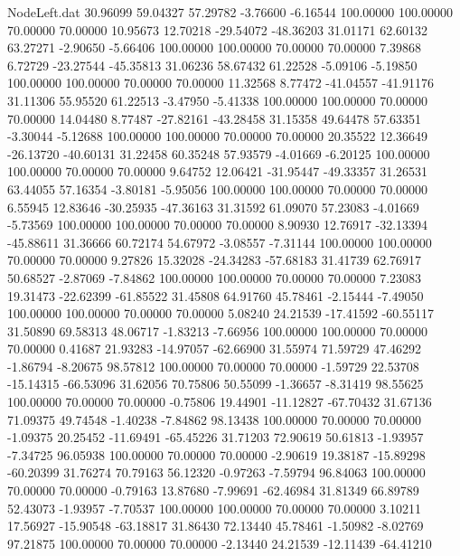 \begin{filecontents}{NodeLeft.dat}
  30.96099   59.04327   57.29782    -3.76600   -6.16544  100.00000  100.00000   70.00000   70.00000   10.95673   12.70218  -29.54072  -48.36203
  31.01171   62.60132   63.27271    -2.90650   -5.66406  100.00000  100.00000   70.00000   70.00000    7.39868    6.72729  -23.27544  -45.35813
  31.06236   58.67432   61.22528    -5.09106   -5.19850  100.00000  100.00000   70.00000   70.00000   11.32568    8.77472  -41.04557  -41.91176
  31.11306   55.95520   61.22513    -3.47950   -5.41338  100.00000  100.00000   70.00000   70.00000   14.04480    8.77487  -27.82161  -43.28458
  31.15358   49.64478   57.63351    -3.30044   -5.12688  100.00000  100.00000   70.00000   70.00000   20.35522   12.36649  -26.13720  -40.60131
  31.22458   60.35248   57.93579    -4.01669   -6.20125  100.00000  100.00000   70.00000   70.00000    9.64752   12.06421  -31.95447  -49.33357
  31.26531   63.44055   57.16354    -3.80181   -5.95056  100.00000  100.00000   70.00000   70.00000    6.55945   12.83646  -30.25935  -47.36163
  31.31592   61.09070   57.23083    -4.01669   -5.73569  100.00000  100.00000   70.00000   70.00000    8.90930   12.76917  -32.13394  -45.88611
  31.36666   60.72174   54.67972    -3.08557   -7.31144  100.00000  100.00000   70.00000   70.00000    9.27826   15.32028  -24.34283  -57.68183
  31.41739   62.76917   50.68527    -2.87069   -7.84862  100.00000  100.00000   70.00000   70.00000    7.23083   19.31473  -22.62399  -61.85522
  31.45808   64.91760   45.78461    -2.15444   -7.49050  100.00000  100.00000   70.00000   70.00000    5.08240   24.21539  -17.41592  -60.55117
  31.50890   69.58313   48.06717    -1.83213   -7.66956  100.00000  100.00000   70.00000   70.00000    0.41687   21.93283  -14.97057  -62.66900
  31.55974   71.59729   47.46292    -1.86794   -8.20675   98.57812  100.00000   70.00000   70.00000   -1.59729   22.53708  -15.14315  -66.53096
  31.62056   70.75806   50.55099    -1.36657   -8.31419   98.55625  100.00000   70.00000   70.00000   -0.75806   19.44901  -11.12827  -67.70432
  31.67136   71.09375   49.74548    -1.40238   -7.84862   98.13438  100.00000   70.00000   70.00000   -1.09375   20.25452  -11.69491  -65.45226
  31.71203   72.90619   50.61813    -1.93957   -7.34725   96.05938  100.00000   70.00000   70.00000   -2.90619   19.38187  -15.89298  -60.20399
  31.76274   70.79163   56.12320    -0.97263   -7.59794   96.84063  100.00000   70.00000   70.00000   -0.79163   13.87680   -7.99691  -62.46984
  31.81349   66.89789   52.43073    -1.93957   -7.70537  100.00000  100.00000   70.00000   70.00000    3.10211   17.56927  -15.90548  -63.18817
  31.86430   72.13440   45.78461    -1.50982   -8.02769   97.21875  100.00000   70.00000   70.00000   -2.13440   24.21539  -12.11439  -64.41210

\end{filecontents}
